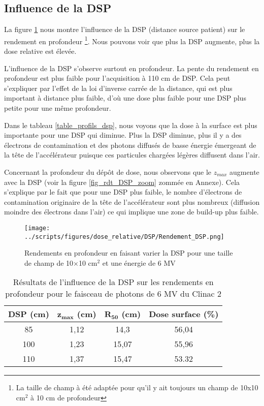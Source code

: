 \documentclass{book}
\begin{document}
\subsection{Influence de la DSP}

La figure \ref*{fig_rdt_dsp} nous montre l'influence de la DSP (distance source patient) sur le rendement en profondeur \footnote{La taille de champ à été adaptée pour qu'il y ait toujours un champ de 10x10 cm$^2$ à 10 cm de profondeur}. Nous pouvons voir que plus la DSP augmente, plus la dose relative est élevée.

L'influence de la DSP s'observe surtout en profondeur. La pente du rendement en profondeur est plus faible pour l'acquisition à 110 cm de DSP. Cela peut s'expliquer par l'effet de la loi d'inverse carrée de la distance, qui est plus important à distance plus faible, d'où une dose plus faible pour une DSP plus petite pour une même profondeur. 

Dans le tableau \ref*{table_profils_dsp}, nous voyons que la dose à la surface est plus importante pour une DSP qui diminue. Plus la DSP diminue, plus il y a des électrons de contamination et des photons diffusés de basse énergie émergeant de la tête de l'accélérateur puisque ces particules chargées légères diffusent dans l'air.

Concernant la profondeur du dépôt de dose, nous observons que le $z_{max}$ augmente avec la DSP (voir la figure \ref*{fig_rdt_DSP_zoom} zommée en Annexe). Cela s'explique par le fait que pour une DSP plus faible, le nombre d'électrons de contamination originaire de la tête de l'accélérateur sont plus nombreux (diffusion moindre des électrons dans l'air) ce qui implique une zone de build-up plus faible.

\begin{figure}[h]
  \centering
  \texttt{[image: ../scripts/figures/dose\_relative/DSP/Rendement\_DSP.png]}
  \caption{Rendements en profondeur en faisant varier la DSP pour une taille de champ de 10$\times$10 cm$^2$ et une énergie de 6 MV}
  \label{fig_rdt_dsp}
\end{figure}

\begin{table}[h]
  \centering
  \begin{tabular}{cccc}
    \toprule
    \textbf{DSP (cm)} & $\mathbf{z_{max}}$ \textbf{(cm)} & $\mathbf{R_{50}}$ \textbf{(cm)} & \textbf{Dose surface (\%)} \\
    \toprule
    85 & 1,12 & 14,3 & 56,04 \\
    100 & 1,23 & 15,07 & 55,96 \\
    110 & 1,37 & 15,47 & 53.32 \\
    \bottomrule
  \end{tabular}
  \caption{Résultats de l'influence de la DSP sur les rendements en profondeur pour le faisceau de photons de 6 MV du Clinac 2}
  \label{table_rdt_dsp}
\end{table}
\end{document}
